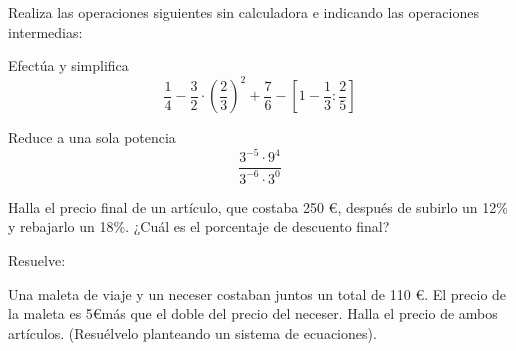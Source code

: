 \documentclass[addpoints,spanish, 12pt,a4paper]{exam}
\begin{document}
\begin{questions}

\question[3] Realiza las operaciones siguientes sin calculadora e indicando las operaciones intermedias:
\noaddpoints %
\addpoints

\question[1] Efectúa y simplifica  \[\frac{1}{4}-\frac{3}{2}\cdot\left(\frac{2}{3}\right)^{2}+\frac{7}{6}-\left[1-\frac{1}{3}:\frac{2}{5}\right]\]
\addpoints

\question[1] Reduce a una sola potencia  \[\frac{3^{-5}\cdot9^{4}}{3^{-6}\cdot3^{0}}\]
\addpoints

\question[1] Halla el precio final de un artículo, que costaba 250 \euro, después de subirlo un 12\% y rebajarlo un 18\%. ¿Cuál es el porcentaje de descuento final?
\addpoints

\question[3] Resuelve:
\noaddpoints %
\begin{parts}
\part[1] \[3x+2-5x=9x+6x-5\]
\part[1] \[3\left(x-1\right)+2\left(x+6\right)=19\]
\part[1] \[\begin{cases}x+2y=5\\ 2x-y=0 \end{cases}\]
\end{parts}
\addpoints


\question[2] Una maleta de viaje y un neceser costaban juntos un total de 110 \euro . El precio de la maleta es 5\euro \space más que el doble del precio del neceser. Halla el precio de ambos artículos. (Resuélvelo planteando un sistema de ecuaciones).
\addpoints


\end{questions}
\end{document}
